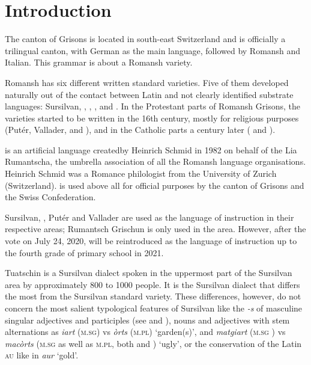 \chapter{Introduction}
The canton of Grisons is located in south-east Switzerland and is officially a trilingual canton, with German as the main language, followed by Romansh and Italian. This grammar is about a Romansh variety.

Romansh has six different written standard varieties. Five of them developed naturally out of the contact between Latin and not clearly identified substrate languages: Sursilvan, , , , and . In the Protestant parts of Romansh Grisons, the varieties started to be written in the 16th century, mostly for religious purposes (Putér, Vallader, and ), and in the Catholic parts a century later ( and ). 

 is an artificial language createdby Heinrich Schmid  in 1982 on behalf of the Lia Rumantscha, the umbrella association of all the Romansh language organisations. Heinrich Schmid was a Romance philologist from the University of Zurich (Switzerland).  is used above all for official purposes by the canton of Grisons and the Swiss Confederation.

Sursilvan, , Putér and Vallader are used as the language of instruction in their respective areas; Rumantsch Grischun is only used in the  area. However, after the vote on July 24, 2020,  will be reintroduced as the language of instruction up to the fourth grade of primary school in 2021. 

Tuatschin is a Sursilvan dialect spoken in the uppermost part of the Sursilvan area by approximately 800 to 1000 people. It is the Sursilvan dialect that differs the most from the Sursilvan standard variety. These differences, however, do not concern the most salient typological features of Sursilvan like the  \textit{-s} of masculine singular adjectives and participles (see  and ), nouns and adjectives with stem alternations as \textit{iart} (\textsc{m.sg}) vs \textit{òrts} \textsc{(m.pl}) `garden(s)', and \textit{matgiart} (\textsc{m.sg} ) vs \textit{macòrts} \textsc{(m.sg}  as well as \textsc{m.pl}, both  and ) `ugly', or the conservation of the Latin  \textsc{au} like in \textit{aur} `gold'.

